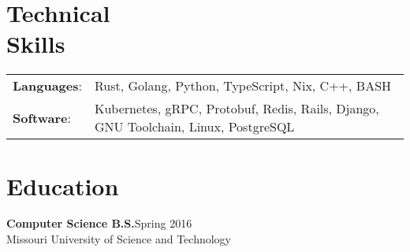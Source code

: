 \documentclass[margin]{res}
\begin{document}
\begin{resume}
    \section{Technical \\ Skills}
      \begin{tabular}{l p{3.6in}}
        \textbf{Languages}:                   & Rust, Golang, Python, TypeScript, Nix, C++, BASH \\ [1pt]
        \textbf{Software}:                    & Kubernetes, gRPC, Protobuf, Redis, Rails, Django, GNU Toolchain, Linux, PostgreSQL \\ [1pt]
      \end{tabular}
    \section{Education}
    \textbf{Computer Science B.S.}\hfill Spring 2016 \\ [1pt]
    Missouri University of Science and Technology

  \end{resume}
\end{document}
